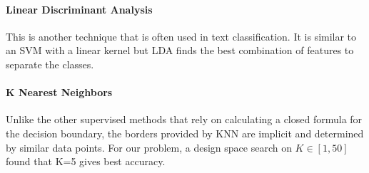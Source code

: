 \paragraph{Linear Discriminant Analysis}

This is another technique that is often used in text classification.
It is similar to an SVM with a linear kernel but LDA finds the best
combination of features to separate the classes.

\paragraph{K Nearest Neighbors}

Unlike the other supervised methods that rely on calculating a closed formula for
the decision boundary, the borders provided by KNN are implicit and
determined by similar data points. For our problem, a design space
search on $K \in [1,50]$ found that K=5 gives best accuracy.





